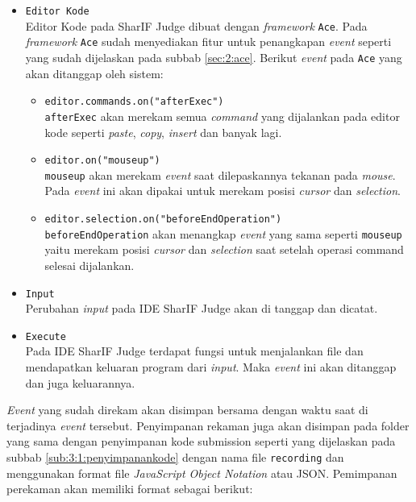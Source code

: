 \begin{itemize}
      \item \verb|Editor Kode| \\
            Editor Kode pada SharIF Judge dibuat dengan \textit{framework} \verb|Ace|. Pada \textit{framework} \verb|Ace| sudah menyediakan fitur untuk penangkapan \textit{event} seperti yang sudah dijelaskan pada subbab \ref{sec:2:ace}. Berikut \textit{event} pada \verb|Ace| yang akan ditanggap oleh sistem:

            \begin{itemize}
                  \item \verb|editor.commands.on("afterExec")| \\
                        \verb|afterExec| akan merekam semua \textit{command} yang dijalankan pada editor kode seperti \textit{paste}, \textit{copy}, \textit{insert} dan banyak lagi.
                  \item \verb|editor.on("mouseup")| \\
                        \verb|mouseup| akan merekam \textit{event} saat dilepaskannya tekanan pada \textit{mouse}. Pada \textit{event} ini akan dipakai untuk merekam posisi \textit{cursor} dan \textit{selection}.
                  \item \verb|editor.selection.on("beforeEndOperation")| \\
                        \verb|beforeEndOperation| akan menangkap \textit{event} yang sama seperti \verb|mouseup| yaitu merekam posisi \textit{cursor} dan \textit{selection} saat setelah operasi command selesai dijalankan.
            \end{itemize}

      \item \verb|Input| \\
            Perubahan \textit{input} pada IDE SharIF Judge akan di tanggap dan dicatat.
      \item \verb|Execute| \\
            Pada IDE SharIF Judge terdapat fungsi untuk menjalankan file dan mendapatkan keluaran program dari \textit{input}. Maka \textit{event} ini akan ditanggap dan juga keluarannya.
\end{itemize}

\textit{Event} yang sudah direkam akan disimpan bersama dengan waktu saat di terjadinya \textit{event} tersebut. Penyimpanan rekaman juga akan disimpan pada folder yang sama dengan penyimpanan kode submission seperti yang dijelaskan pada subbab \ref{sub:3:1:penyimpanankode} dengan nama file \verb|recording| dan menggunakan format file \textit{JavaScript Object Notation} atau JSON. Pemimpanan perekaman akan memiliki format sebagai berikut:

